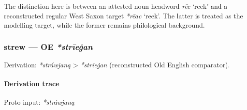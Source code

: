 \documentclass[
  british,
  a4paper,
]{article}
\providecommand{\Recon}[1]{\emph{*#1}}
\begin{document}
The distinction here is between an attested noun headword {\emph{rēc}}
`reek' and a reconstructed regular West Saxon target \Recon{rēac}
`reek'. The latter is treated as the modelling target, while the former
remains philological background.

\subsubsection{\texorpdfstring{strew --- OE
\emph{*strīeġan}}{strew --- OE *strīeġan}}\label{strew-oe-strux12beux121an}

Derivation: \emph{*stráwjaną} \textgreater{} \emph{*strīeġan}
(reconstructed Old English comparator).

\paragraph{Derivation trace}\label{derivation-trace-176}

Proto input: \emph{*stráwjaną}

\begingroup
\setlength{\fboxsep}{6pt}
\end{document}
